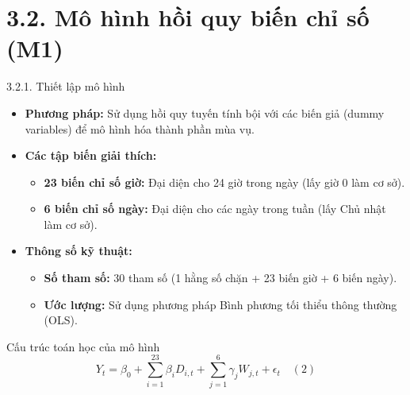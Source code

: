\documentclass[aspectratio=43]{beamer}
\begin{document}
\section{3.2. Mô hình hồi quy biến chỉ số (M1)}

\begin{frame}{3.2.1. Thiết lập mô hình}
    \begin{itemize}
        \item \textbf{Phương pháp:} Sử dụng hồi quy tuyến tính bội với các biến giả (dummy variables) để mô hình hóa thành phần mùa vụ.
        \item \textbf{Các tập biến giải thích:}
        \begin{itemize}
            \item \textbf{23 biến chỉ số giờ:} Đại diện cho 24 giờ trong ngày (lấy giờ 0 làm cơ sở).
            \item \textbf{6 biến chỉ số ngày:} Đại diện cho các ngày trong tuần (lấy Chủ nhật làm cơ sở).
        \end{itemize}
        \item \textbf{Thông số kỹ thuật:}
        \begin{itemize}
            \item \textbf{Số tham số:} 30 tham số (1 hằng số chặn + 23 biến giờ + 6 biến ngày).
            \item \textbf{Ước lượng:} Sử dụng phương pháp Bình phương tối thiểu thông thường (OLS).
        \end{itemize}
    \end{itemize}
    \begin{block}{Cấu trúc toán học của mô hình}
        $$Y_t = \beta_0 + \sum_{i=1}^{23} \beta_i D_{i,t} + \sum_{j=1}^{6} \gamma_j W_{j,t} + \epsilon_t \quad (2)$$
    \end{block}
\end{frame}
\end{document}
